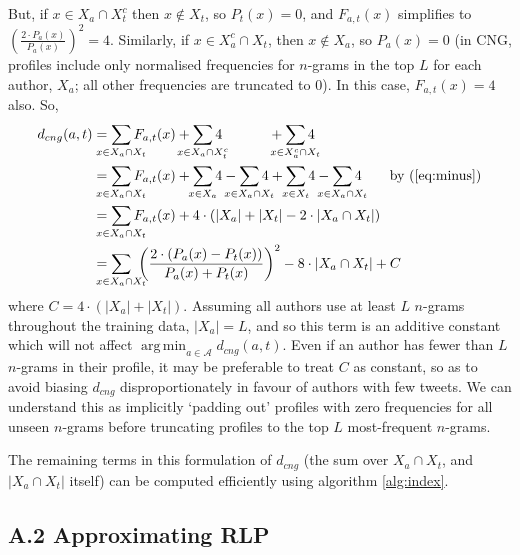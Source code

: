 \documentclass[twocolumn,10pt]{article}
\DeclareMathOperator*{\argmin}{arg\,min}
\begin{document}
But, if $x \in X_a \cap X_t^c$ then $x \notin X_t$, so $P_t(x) = 0$,
and $F_{a,t}(x)$ simplifies to
$\left(\frac{2\cdot P_a(x)}{P_a(x)}\right)^2 = 4$.
Similarly, if $x \in X_a^c \cap X_t$, then $x \notin X_a$, so $P_a(x) = 0$
(in CNG, profiles include only normalised frequencies for $n$-grams in
the top $L$ for each author, $X_a$; all other frequencies are truncated to 0).
In this case, $F_{a,t}(x) = 4$ also. So,
\begin{align*}
d_{cng}(a, t)
&=
    \smashoperator{\sum_{x \in X_a \cap X_t}}   F_{a,t}(x)
    +
    \smashoperator{\sum_{x \in X_a \cap X_t^c}} 4
    \hspace{3.3em} + 
    \smashoperator{\sum_{x \in X_a^c \cap X_t}} 4
\\
&=
    \smashoperator{\sum_{x \in X_a \cap X_t}}   F_{a,t}(x)
    + \smashoperator{\sum_{x \in X_a}}          4
    - \smashoperator{\sum_{x \in X_a \cap X_t}} 4
    + \smashoperator{\sum_{x \in X_t}}          4
    - \smashoperator{\sum_{x \in X_a \cap X_t}} 4
\tag*{by (\ref{eq:minus})}
\\
&=
    \smashoperator{\sum_{x \in X_a \cap X_t}}   F_{a,t}(x)
    + 4 \cdot (
          |X_a|
        + |X_t|
        - 2 \cdot |X_a \cap X_t|
    )
\\
&=
    \smashoperator{\sum_{x \in X_a \cap X_t}}\ 
        {\left ( \frac{2 \cdot (P_a(x) - P_t(x))}{P_a(x) + P_t(x)} \right )}^2
        - 8 \cdot |X_a \cap X_t| + C
\end{align*} 
where $C=4 \cdot (|X_a| + |X_t|)$. Assuming all authors use at least
$L$ $n$-grams throughout the training data, $|X_a| = L$, and so this
term is an additive constant which will not affect
$\argmin_{a\in\mathcal{A}}d_{cng}(a,t)$.
Even if an author has fewer than $L$ $n$-grams in their profile, it
may be preferable to treat $C$ as constant, so as to avoid biasing
$d_{cng}$ disproportionately in favour of authors with few tweets.
We can understand this as implicitly `padding out' profiles with
zero frequencies for all unseen $n$-grams before truncating profiles
to the top $L$ most-frequent $n$-grams. 

The remaining terms in this formulation of $d_{cng}$ (the sum over
$X_a \cap X_t$, and $|X_a \cap X_t|$ itself)
can be computed efficiently using algorithm \ref{alg:index}.


\subsection*{A.2 Approximating RLP}
\end{document}

